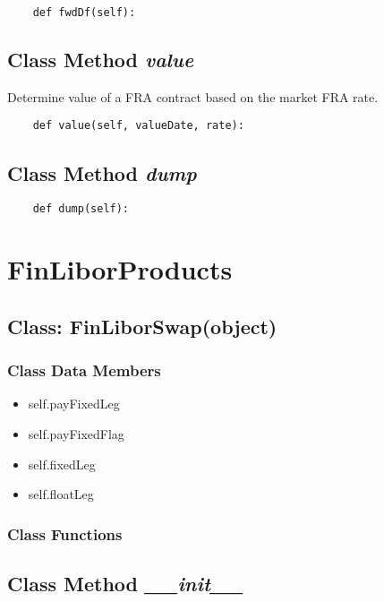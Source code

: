 \documentclass[twoside,11pt]{book}
\begin{document}
\begin{lstlisting}
    def fwdDf(self):
\end{lstlisting}

\subsection{Class Method {\it value}}
Determine value of a FRA contract based on the market FRA rate. 

\begin{lstlisting}
    def value(self, valueDate, rate):
\end{lstlisting}

\subsection{Class Method {\it dump}}


\begin{lstlisting}
    def dump(self):
\end{lstlisting}

\newpage
\section{FinLiborProducts}

\subsection{Class: FinLiborSwap(object)}


\subsubsection{Class Data Members}
\begin{itemize}
\item{self.payFixedLeg}
\item{self.payFixedFlag}
\item{self.fixedLeg}
\item{self.floatLeg}
\end{itemize}

\subsubsection{Class Functions}

\subsection{Class Method {\it \_\_init\_\_}}
\end{document}
